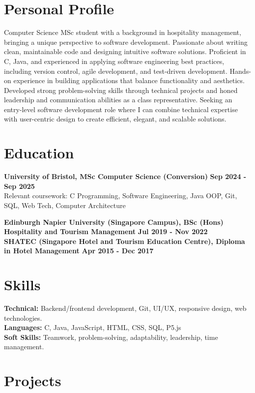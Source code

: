 \documentclass[10pt,a4paper]{article} %
\begin{document}
\section*{Personal Profile}
Computer Science MSc student with a background in hospitality management, bringing a unique perspective to software development. Passionate about writing clean, maintainable code and designing intuitive software solutions. Proficient in C, Java, and experienced in applying software engineering best practices, including version control, agile development, and test-driven development. Hands-on experience in building applications that balance functionality and aesthetics. Developed strong problem-solving skills through technical projects and honed leadership and communication abilities as a class representative. Seeking an entry-level software development role where I can combine technical expertise with user-centric design to create efficient, elegant, and scalable solutions.

\section*{Education}

\textbf{University of Bristol, MSc Computer Science (Conversion)} \hfill \textbf{Sep 2024 - Sep 2025} \\
Relevant coursework: C Programming, Software Engineering, Java OOP, Git, SQL, Web Tech, Computer Architecture

\textbf{Edinburgh Napier University (Singapore Campus), BSc (Hons) Hospitality and Tourism Management} \hfill \textbf{Jul 2019 - Nov 2022} \\

\textbf{SHATEC (Singapore Hotel and Tourism Education Centre), Diploma in Hotel Management} \hfill \textbf{Apr 2015 - Dec 2017} \\

\section*{Skills}

\textbf{Technical:} Backend/frontend development, Git, UI/UX, responsive design, web technologies. \\
\textbf{Languages:} C, Java, JavaScript, HTML, CSS, SQL, P5.js \\
\textbf{Soft Skills:} Teamwork, problem-solving, adaptability, leadership, time management.

\section*{Projects}
\end{document}
